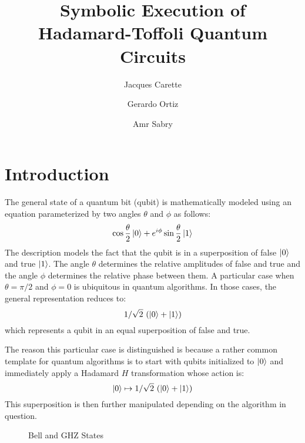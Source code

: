 \documentclass[sigplan,review]{acmart}
\begin{document}
\title[Symbolic Quantum Execution]{Symbolic Execution of \\
  Hadamard-Toffoli Quantum Circuits}

\author{Jacques Carette}

\author{Gerardo Ortiz}

\author{Amr Sabry}

\maketitle

\section{Introduction}

The general state of a quantum bit (qubit) is mathematically modeled
using an equation parameterized by two angles $\theta$ and $\phi$ as
follows:
\[
\cos{\frac{\theta}{2}} \ket{0} + e^{i\phi} \sin{\frac{\theta}{2}} \ket{1} 
\]
The description models the fact that the qubit is in a superposition
of false $\ket{0}$ and true $\ket{1}$. The angle $\theta$
determines the relative amplitudes of false and true and the angle
$\phi$ determines the relative phase between them. A particular case
when $\theta = \pi/2$ and $\phi=0$ is ubiquitous in quantum
algorithms. In those cases, the general representation reduces to:
\[
1/\sqrt{2}~ (\ket{0} + \ket{1} )
\]
which represents a qubit in an equal superposition of false and
true.

The reason this particular case is distinguished is because a rather
common template for quantum algorithms is to start with qubits
initialized to $\ket{0}$ and immediately apply a Hadamard $H$ transformation
whose action is:
\[
  \ket{0} \mapsto 1/\sqrt{2} ~(\ket{0} + \ket{1})
\]
This superposition is then further manipulated depending on the
algorithm in question.

\begin{figure}[b]
\begin{center}
\qquad\qquad
{}
\end{center}
\caption{\label{fig:bell2}Bell and GHZ States}
\end{figure}
\end{document}
